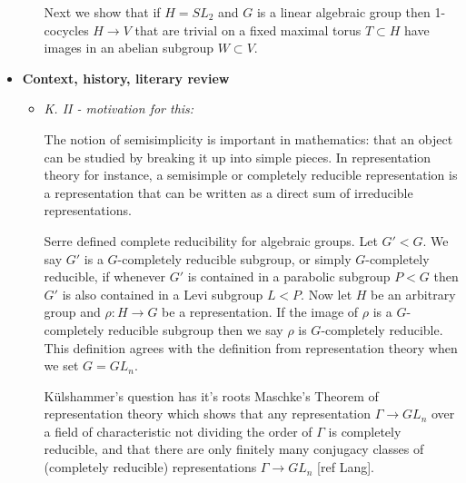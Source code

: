 \begin{itemize}
\begin{itemize}
		Next we show that if $H = SL_2$ and $G$ is a linear algebraic group then 1-cocycles $H\rightarrow V$ that are trivial on a fixed maximal torus $T\subset H$ have images in an abelian subgroup $W\subset V$.
	\end{itemize}

	\item[] \textbf{Context, history, literary review}
	\begin{itemize}
		\item \emph{K. II - motivation for this:}
		
		
		The notion of semisimplicity is important in mathematics: that an object can be studied by breaking it up into simple pieces. In representation theory for instance, a semisimple or completely reducible representation is a representation that can be written as a direct sum of irreducible representations.
		
		
		Serre defined complete reducibility for algebraic groups. Let $G' < G$. We say $G'$ is a $G$-completely reducible subgroup, or simply $G$-completely reducible, if whenever $G'$ is contained in a parabolic subgroup $P < G$ then $G'$ is also contained in a Levi subgroup $L < P$. Now let $H$ be an arbitrary group and $\rho:H\rightarrow G$ be a representation. If the image of $\rho$ is a $G$-completely reducible subgroup then we say $\rho$ is $G$-completely reducible. This definition agrees with the definition from representation theory when we set $G=GL_n$.
		
		
		K\"ulshammer's question has it's roots Maschke's Theorem of representation theory which shows that any representation $\Gamma \rightarrow GL_n$ over a field of characteristic not dividing the order of $\Gamma$ is completely reducible, and that there are only finitely many conjugacy classes of (completely reducible) representations $\Gamma \rightarrow GL_n$ [ref Lang].
		

\end{itemize}
\end{itemize}
